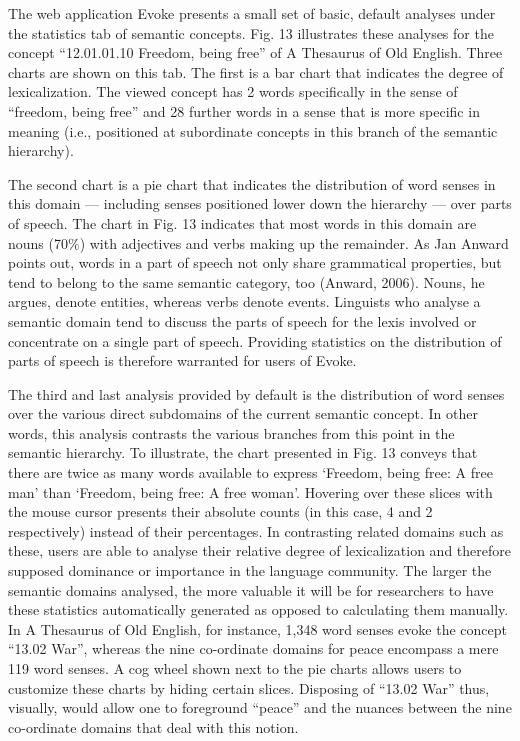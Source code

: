 The web application Evoke presents a small set of basic, default analyses under the statistics tab of semantic concepts. Fig. 13 illustrates these analyses for the concept “12.01.01.10 Freedom, being free” of A Thesaurus of Old English. Three charts are shown on this tab. The first is a bar chart that indicates the degree of lexicalization. The viewed concept has 2 words specifically in the sense of “freedom, being free” and 28 further words in a sense that is more specific in meaning (i.e., positioned at subordinate concepts in this branch of the semantic hierarchy). 

The second chart is a pie chart that indicates the distribution of word senses in this domain — including senses positioned lower down the hierarchy — over parts of speech. The chart in Fig. 13 indicates that most words in this domain are nouns (70\%) with adjectives and verbs making up the remainder. As Jan Anward points out, words in a part of speech not only share grammatical properties, but tend to belong to the same semantic category, too (Anward, 2006). Nouns, he argues, denote entities, whereas verbs denote events. Linguists who analyse a semantic domain tend to discuss the parts of speech for the lexis involved or concentrate on a single part of speech.  Providing statistics on the distribution of parts of speech is therefore warranted for users of Evoke. 

The third and last analysis provided by default is the distribution of word senses over the various direct subdomains of the current semantic concept. In other words, this analysis contrasts the various branches from this point in the semantic hierarchy. To illustrate, the chart presented in Fig. 13 conveys that there are twice as many words available to express ‘Freedom, being free: A free man’ than ‘Freedom, being free: A free woman’. Hovering over these slices with the mouse cursor presents their absolute counts (in this case, 4 and 2 respectively) instead of their percentages. In contrasting related domains such as these, users are able to analyse their relative degree of lexicalization and therefore supposed dominance or importance in the language community. The larger the semantic domains analysed, the more valuable it will be for researchers to have these statistics automatically generated as opposed to calculating them manually. In A Thesaurus of Old English, for instance, 1,348 word senses evoke the concept “13.02 War”, whereas the nine co-ordinate domains for peace encompass a mere 119 word senses. A cog wheel shown next to the pie charts allows users to customize these charts by hiding certain slices. Disposing of “13.02 War” thus, visually, would allow one to foreground “peace” and the nuances between the nine co-ordinate domains that deal with this notion.

